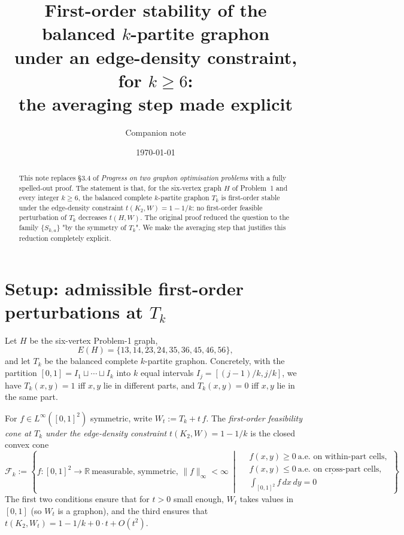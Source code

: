 \documentclass[11pt]{amsart}
\title[First-order stability of $T_k$ for $k\ge 6$]%
{First-order stability of the balanced $k$-partite graphon\\
under an edge-density constraint, for $k\ge 6$:\\
the averaging step made explicit}
\author{Companion note}
\date{\today}
\theoremstyle{definition}
\newcommand{\1}{\mathbf 1}
\newcommand{\R}{\mathbb R}
\newcommand{\dd}{\,d}
\begin{document}
\maketitle

\begin{abstract}
This note replaces §3.4 of \emph{Progress on two graphon optimisation problems}
with a fully spelled-out proof.  The statement is that, for the six-vertex graph
$H$ of Problem~1 and every integer $k\ge 6$, the balanced complete $k$-partite
graphon $T_k$ is first-order stable under the edge-density constraint
$t(K_2,W)=1-1/k$: no first-order feasible perturbation of $T_k$ decreases
$t(H,W)$.  The original proof reduced the question to the family
$\{S_{k,a}\}$ "by the symmetry of $T_k$".  We make the averaging step that
justifies this reduction completely explicit.
\end{abstract}

\section{Setup: admissible first-order perturbations at $T_k$}

Let $H$ be the six-vertex Problem-1 graph,
\[
   E(H) = \{13,14,23,24,35,36,45,46,56\},
\]
and let $T_k$ be the balanced complete $k$-partite graphon.  Concretely, with
the partition $[0,1] = I_1 \sqcup \cdots \sqcup I_k$ into $k$ equal intervals
$I_j = [(j-1)/k, j/k]$, we have $T_k(x,y) = 1$ iff $x,y$ lie in different parts,
and $T_k(x,y) = 0$ iff $x,y$ lie in the same part.

For $f\in L^\infty([0,1]^2)$ symmetric, write $W_t := T_k + t\, f$.  The
\emph{first-order feasibility cone at $T_k$ under the edge-density constraint}
$t(K_2,W) = 1-1/k$ is the closed convex cone
\begin{equation}
\label{eq:feas-cone}
\mathcal F_k := \left\{
   f : [0,1]^2 \to \R\ \text{measurable, symmetric, } \|f\|_\infty<\infty
   \ \middle|\
   \begin{aligned}
   &f(x,y)\ge 0\ \text{a.e.\ on within-part cells},\\
   &f(x,y)\le 0\ \text{a.e.\ on cross-part cells},\\
   &\int_{[0,1]^2} f \dd x\dd y = 0
   \end{aligned}
\right\}.
\end{equation}
The first two conditions ensure that for $t>0$ small enough, $W_t$ takes values
in $[0,1]$ (so $W_t$ is a graphon), and the third ensures that
$t(K_2,W_t)=1-1/k+0\cdot t + O(t^2)$.
\end{document}
